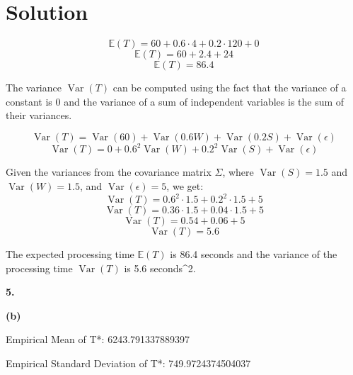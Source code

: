 \documentclass{harvardml}
\theoremstyle{definition}
\theoremstyle{plain}
\newenvironment{solution}
  {\color{blue}\section*{Solution}}
{}
\begin{document}
\begin{solution}
\[ \mathbb{E}(T) = 60 + 0.6 \cdot 4 + 0.2 \cdot 120 + 0 \]
\[ \mathbb{E}(T) = 60 + 2.4 + 24 \]
\[ \mathbb{E}(T) = 86.4 \]

The variance \(\operatorname{Var}(T)\) can be computed using the fact that the variance of a constant is 0 and the variance of a sum of independent variables is the sum of their variances.

\[ \operatorname{Var}(T) = \operatorname{Var}(60) + \operatorname{Var}(0.6W) + \operatorname{Var}(0.2S) + \operatorname{Var}(\epsilon) \]
\[ \operatorname{Var}(T) = 0 + 0.6^2 \operatorname{Var}(W) + 0.2^2 \operatorname{Var}(S) + \operatorname{Var}(\epsilon) \]

Given the variances from the covariance matrix \(\Sigma\), where \(\operatorname{Var}(S) = 1.5\) and \(\operatorname{Var}(W) = 1.5\), and \(\operatorname{Var}(\epsilon) = 5\), we get:
\[ \operatorname{Var}(T) = 0.6^2 \cdot 1.5 + 0.2^2 \cdot 1.5 + 5 \]
\[ \operatorname{Var}(T) = 0.36 \cdot 1.5 + 0.04 \cdot 1.5 + 5 \]
\[ \operatorname{Var}(T) = 0.54 + 0.06 + 5 \]
\[ \operatorname{Var}(T) = 5.6 \]

The expected processing time \(\mathbb{E}(T)\) is 86.4 seconds and the variance of the processing time \(\operatorname{Var}(T)\) is 5.6 seconds^2.

\medskip
\noindent \textbf{5.}

\medskip
\noindent \textbf{(b)}

Empirical Mean of T*: 6243.791337889397

Empirical Standard Deviation of T*: 749.9724374504037

\end{solution} 
\end{document}
